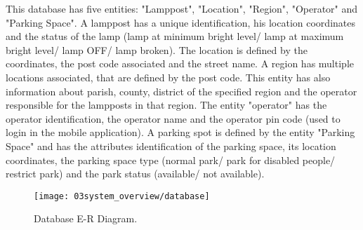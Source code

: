 This database has five entities: "Lamppost", "Location", "Region", "Operator" and "Parking Space". A lamppost has a unique identification, his location coordinates and the status of the lamp (lamp at minimum bright level/ lamp at maximum bright level/ lamp OFF/ lamp broken). The location is defined by the coordinates, the post code associated and the street name. A region has multiple locations associated, that are defined by the post code. This entity has also information about parish, county, district of the specified region and the operator responsible for the lampposts in that region. The entity "operator" has the operator identification, the operator name and the operator pin code (used to login in the mobile application). A parking spot is defined by the entity "Parking Space" and has the attributes identification of the parking space, its location coordinates, the parking space type (normal park/ park for disabled people/ restrict park) and the park status (available/ not available).

%
%
%
%
%

\begin{figure}[ht]
        \centering
        \texttt{[image: 03system\_overview/database]}
        \caption{Database E-R Diagram.}
        \label{fig:Database}
\end{figure}

